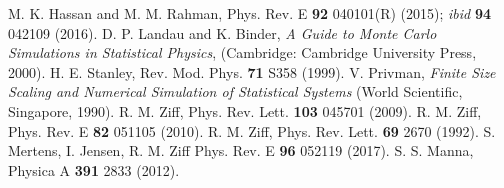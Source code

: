 \documentclass[twocolumn,showpacs,preprintnumbers,amsmath,amssymb]{article}
\begin{document}
\begin{thebibliography}{99}
 M. K. Hassan and M. M. Rahman, Phys. Rev. E {\bf 92} 040101(R) (2015); 
{\it ibid}  {\bf 94} 042109 (2016).
  D. P. Landau and K. Binder, {\it A Guide to Monte Carlo Simulations in Statistical Physics}, (Cambridge: Cambridge University Press, 2000).
 H. E. Stanley, Rev. Mod. Phys. {\bf 71}  S358 (1999).
 V. Privman, {\it Finite Size Scaling and Numerical Simulation
of Statistical Systems} (World Scientific, Singapore, 1990).
 R. M. Ziff, Phys. Rev. Lett. {\bf 103}  045701 (2009).
 R. M. Ziff, Phys. Rev. E {\bf 82} 051105 (2010).
 R. M. Ziff, Phys. Rev. Lett. {\bf 69} 2670 (1992).
 S. Mertens, I. Jensen, R.  M. Ziff  Phys. Rev. E {\bf 96} 052119 (2017).
 S. S. Manna, Physica A {\bf 391} 2833 (2012).





\end{thebibliography}
\end{document}

